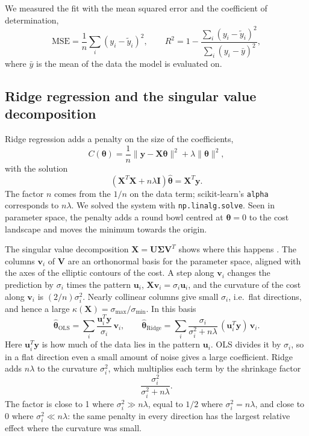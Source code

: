 We measured the fit with the mean squared error and the coefficient of determination,
$$
\mathrm{MSE} = \frac{1}{n}\sum_i (y_i - \tilde{y}_i)^2, \qquad
R^2 = 1 - \frac{\sum_i (y_i - \tilde{y}_i)^2}{\sum_i (y_i - \bar{y})^2},
$$
where $\bar{y}$ is the mean of the data the model is evaluated on.

\subsection{Ridge regression and the singular value decomposition}\label{sec:ridge}

Ridge regression adds a penalty on the size of the coefficients,
$$
C(\boldsymbol{\theta}) = \frac{1}{n}\lVert \mathbf{y} - \mathbf{X}\boldsymbol{\theta} \rVert^2 + \lambda \lVert \boldsymbol{\theta} \rVert^2 ,
$$
with the solution
$$
\left(\mathbf{X}^T\mathbf{X} + n\lambda \mathbf{I}\right)\hat{\boldsymbol{\theta}} = \mathbf{X}^T\mathbf{y}.
$$
The factor $n$ comes from the $1/n$ on the data term; scikit-learn's \texttt{alpha} corresponds to $n\lambda$. We solved the system with \texttt{np.linalg.solve}. Seen in parameter space, the penalty adds a round bowl centred at $\boldsymbol{\theta} = 0$ to the cost landscape and moves the minimum towards the origin.

The singular value decomposition $\mathbf{X} = \mathbf{U}\boldsymbol{\Sigma}\mathbf{V}^T$ shows where this happens \cite[Secs.~1.22, 3.8]{HjorthJensen2026}. The columns $\mathbf{v}_i$ of $\mathbf{V}$ are an orthonormal basis for the parameter space, aligned with the axes of the elliptic contours of the cost. A step along $\mathbf{v}_i$ changes the prediction by $\sigma_i$ times the pattern $\mathbf{u}_i$, $\mathbf{X}\mathbf{v}_i = \sigma_i\mathbf{u}_i$, and the curvature of the cost along $\mathbf{v}_i$ is $(2/n)\sigma_i^2$. Nearly collinear columns give small $\sigma_i$, i.e.\ flat directions, and hence a large $\kappa(\mathbf{X}) = \sigma_{\max}/\sigma_{\min}$. In this basis
$$
\hat{\boldsymbol{\theta}}_{\mathrm{OLS}} = \sum_i \frac{\mathbf{u}_i^T\mathbf{y}}{\sigma_i}\,\mathbf{v}_i, \qquad
\hat{\boldsymbol{\theta}}_{\mathrm{Ridge}} = \sum_i \frac{\sigma_i}{\sigma_i^2 + n\lambda}\,(\mathbf{u}_i^T\mathbf{y})\,\mathbf{v}_i .
$$
Here $\mathbf{u}_i^T\mathbf{y}$ is how much of the data lies in the pattern $\mathbf{u}_i$. OLS divides it by $\sigma_i$, so in a flat direction even a small amount of noise gives a large coefficient. Ridge adds $n\lambda$ to the curvature $\sigma_i^2$, which multiplies each term by the shrinkage factor
$$
\frac{\sigma_i^2}{\sigma_i^2 + n\lambda}.
$$
The factor is close to 1 where $\sigma_i^2 \gg n\lambda$, equal to $1/2$ where $\sigma_i^2 = n\lambda$, and close to 0 where $\sigma_i^2 \ll n\lambda$: the same penalty in every direction has the largest relative effect where the curvature was small.

